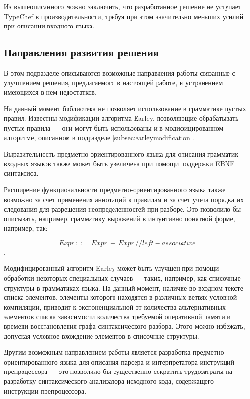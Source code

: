 Из вышеописанного можно заключить, что разработанное решение не уступает TypeChef в производительности, требуя при этом значительно меньших усилий при описании входного языка.

\subsection{Направления развития решения}

В этом подразделе описываются возможные направления работы связанные с улучшением решения, предлагаемого в настоящей работе, и устранением имеющихся в нем недостатков. 

На данный момент библиотека не позволяет использование в грамматике пустых правил. Известны модификации алгоритма Earley, позволяющие обрабатывать пустые правила \cite{emptyrules} --- они могут быть использованы и в модифицированном алгоритме, описанном в подразделе \ref{subsec:earleymodification}.

Выразительность предметно-ориентированного языка для описания грамматик входных языков также может быть увеличена при помощи поддержки EBNF синтаксиса.

Расширение функциональности предметно-ориентированного языка также возможно за счет применения аннотаций к правилам и за счет учета порядка их следования для разрешения неопределенностей при разборе. Это позволило бы описывать, например, грамматику выражений в интуитивно понятной форме, например, так: 

$$Expr\ ::=\ Expr\ +\ Expr\ //left-associative$$.

Модифицированный алгоритм Earley может быть улучшен при помощи обработки некоторых специальных случаев --- таких, например, как списочные структуры в грамматиках языка. На данный момент, наличие во входном тексте списка элементов, элементы которого находятся в различных ветвях условной компиляции, приводит к экспоненциальной от количества альтернативных элементов списка зависимости количества требуемой оперативной памяти и времени восстановления графа синтаксического разбора. Этого можно избежать, допуская условное вхождение элементов в списочные структуры.

Другим возможным направлением работы является разработка предметно-ориентированного языка для описания парсера и интерпретатора инструкций препроцессора --- это позволило бы существенно сократить трудозатраты на разработку синтаксического анализатора исходного кода, содержащего инструкции препроцессора.
